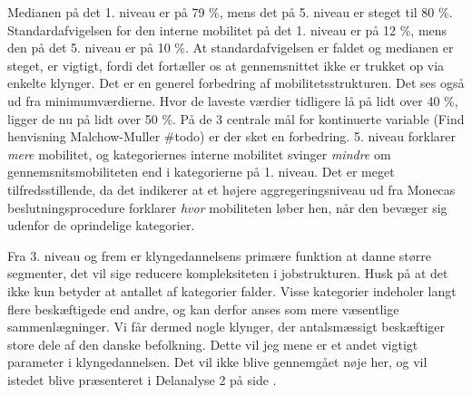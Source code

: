 Medianen på det 1. niveau er på 79 \%, mens det på 5. niveau er steget til 80 \%. Standardafvigelsen for den interne mobilitet på det 1. niveau er på 12 \%, mens den på det 5. niveau er på 10 \%. At standardafvigelsen er faldet og medianen er steget, er vigtigt, fordi det fortæller os at gennemsnittet ikke er trukket op via enkelte klynger.  Det er en generel forbedring af mobilitetsstrukturen. Det ses også ud fra minimumværdierne. Hvor de laveste værdier tidligere lå på lidt over 40 \%, ligger de nu på lidt over 50 \%. På de 3 centrale mål for kontinuerte variable (Find henvisning Malchow-Muller \#todo) er der sket en forbedring. 5. niveau forklarer \emph{mere} mobilitet, og kategoriernes interne mobilitet svinger \emph{mindre} om gennemsnitsmobiliteten end i kategorierne på 1. niveau. Det er meget tilfredsstillende, da det indikerer at et højere aggregeringsniveau ud fra Monecas beslutningsprocedure forklarer \emph{hvor} mobiliteten løber hen, når den bevæger sig udenfor de oprindelige kategorier. 

Fra 3. niveau og frem er klyngedannelsens primære funktion at danne større segmenter, det vil sige reducere kompleksiteten i jobstrukturen. Husk på at det ikke kun betyder at antallet af kategorier falder. Visse kategorier indeholer langt flere beskæftigede end andre, og kan derfor anses som mere væsentlige sammenlægninger. Vi får dermed nogle klynger, der antalsmæssigt beskæftiger store dele af den danske befolkning. Dette vil jeg mene er et andet vigtigt parameter i klyngedannelsen. Det vil ikke blive gennemgået nøje her, og vil istedet blive præsenteret i Delanalyse 2 på side \pageref{kap_delanalyse2_socialeprocesser}.

